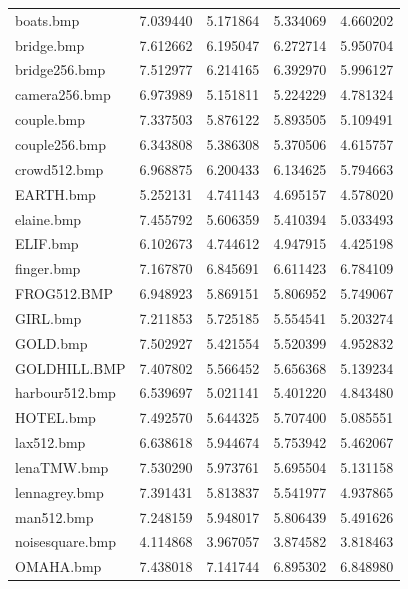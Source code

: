 \documentclass{article}
\begin{document}
\begin{table}
\begin{tabular}{lrrrr}
             boats.bmp &  7.039440 &  5.171864 &  5.334069 &  4.660202 \\
            bridge.bmp &  7.612662 &  6.195047 &  6.272714 &  5.950704 \\
         bridge256.bmp &  7.512977 &  6.214165 &  6.392970 &  5.996127 \\
         camera256.bmp &  6.973989 &  5.151811 &  5.224229 &  4.781324 \\
            couple.bmp &  7.337503 &  5.876122 &  5.893505 &  5.109491 \\
         couple256.bmp &  6.343808 &  5.386308 &  5.370506 &  4.615757 \\
          crowd512.bmp &  6.968875 &  6.200433 &  6.134625 &  5.794663 \\
             EARTH.bmp &  5.252131 &  4.741143 &  4.695157 &  4.578020 \\
            elaine.bmp &  7.455792 &  5.606359 &  5.410394 &  5.033493 \\
              ELIF.bmp &  6.102673 &  4.744612 &  4.947915 &  4.425198 \\
            finger.bmp &  7.167870 &  6.845691 &  6.611423 &  6.784109 \\
           FROG512.BMP &  6.948923 &  5.869151 &  5.806952 &  5.749067 \\
              GIRL.bmp &  7.211853 &  5.725185 &  5.554541 &  5.203274 \\
              GOLD.bmp &  7.502927 &  5.421554 &  5.520399 &  4.952832 \\
          GOLDHILL.BMP &  7.407802 &  5.566452 &  5.656368 &  5.139234 \\
        harbour512.bmp &  6.539697 &  5.021141 &  5.401220 &  4.843480 \\
             HOTEL.bmp &  7.492570 &  5.644325 &  5.707400 &  5.085551 \\
            lax512.bmp &  6.638618 &  5.944674 &  5.753942 &  5.462067 \\
           lenaTMW.bmp &  7.530290 &  5.973761 &  5.695504 &  5.131158 \\
         lennagrey.bmp &  7.391431 &  5.813837 &  5.541977 &  4.937865 \\
            man512.bmp &  7.248159 &  5.948017 &  5.806439 &  5.491626 \\
       noisesquare.bmp &  4.114868 &  3.967057 &  3.874582 &  3.818463 \\
             OMAHA.bmp &  7.438018 &  7.141744 &  6.895302 &  6.848980 \\

\end{tabular}
\end{table}
\end{document}
